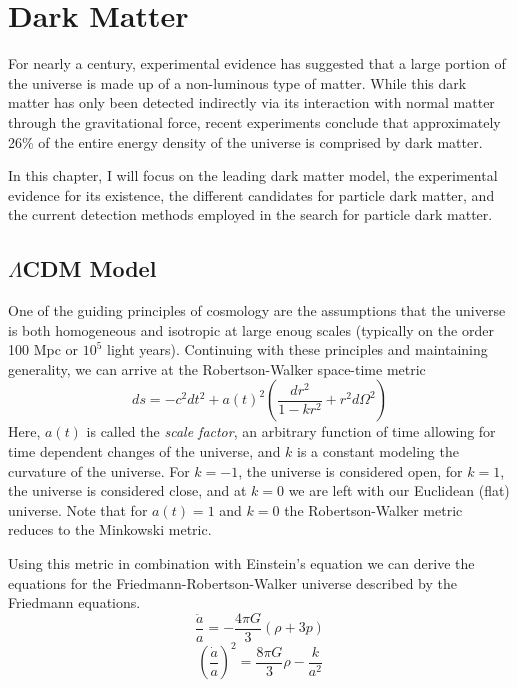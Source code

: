 \documentclass[12pt,twoside]{report}
\begin{document}
\chapter{Dark Matter}

	For nearly a century, experimental evidence has suggested that a large portion of the universe is made up of a non-luminous type of matter.  While this dark matter has only been detected indirectly via its interaction with normal matter through the gravitational force, recent experiments conclude that approximately 26\% of the entire energy density of the universe is comprised by dark matter.

	In this chapter, I will focus on the leading dark matter model, the experimental evidence for its existence, the different candidates for particle dark matter, and the current detection methods employed in the search for particle dark matter.
	
	
\section{$\Lambda$CDM Model}

	One of the guiding principles of cosmology are the assumptions that the universe is both homogeneous and isotropic at large enoug scales (typically on the order 100 Mpc or $10^{5}$ light years).  Continuing with these principles and maintaining generality, we can arrive at the Robertson-Walker space-time metric
	\begin{equation}
		ds = -c^{2}dt^{2} + a(t)^{2}\left( \dfrac{dr^{2}}{1 - kr^{2}} + r^{2}d\Omega^{2}\right)
	\end{equation}
Here, $a(t)$ is called the \emph{scale factor}, an arbitrary function of time allowing for time dependent changes of the universe, and $k$ is a constant modeling the curvature of the universe.  For $k=-1$, the universe is considered open, for $k=1$, the universe is considered close, and at $k=0$ we are left with our Euclidean (flat) universe.  Note that for $a(t) = 1$ and $k = 0$ the Robertson-Walker metric reduces to the Minkowski metric.

	Using this metric in combination with Einstein's equation we can derive the equations for the Friedmann-Robertson-Walker universe described by the Friedmann equations.
	\begin{equation}
		\frac{\ddot{a}}{a} = -\frac{4 \pi G}{3} \left( \rho + 3p \right)
	\end{equation}
	\begin{equation}
		\left( \frac{\dot{a}}{a}\right)^{2} = \frac{8 \pi G}{3} \rho - \frac{k}{a^2}
	\end{equation}
\end{document}
